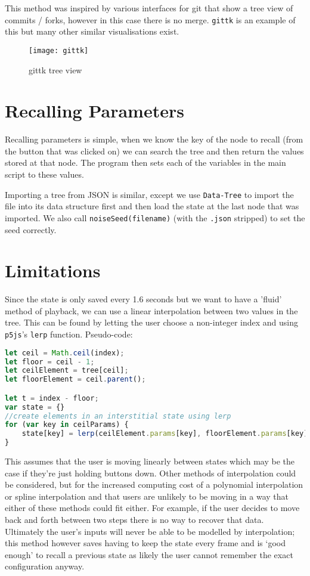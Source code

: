 This method was inspired by various interfaces for git that show a tree view of
commits / forks, however in this case there is no merge. \verb|gittk| is an
example of this but many other similar visualisations exist.

\begin{figure}[H]
    \centering
    \texttt{[image: gittk]}
    \caption{gittk tree view}
\end{figure}

\section{Recalling Parameters}
Recalling parameters is simple, when we know the key of the node to recall (from
the button that was clicked on) we can search the tree and then return the
values stored at that node. The program then sets each of the variables in the
main script to these values.

Importing a tree from JSON is similar, except we use \verb|Data-Tree| to import
the file into its data structure first and then load the state at the last node
that was imported. We also call \verb|noiseSeed(filename)| (with the
\verb|.json| stripped) to set the seed correctly.

\section{Limitations}
Since the state is only saved every 1.6 seconds but we want to have a 'fluid'
method of playback, we can use a linear interpolation between two values in the
tree. This can be found by letting the user choose a non-integer index and using
\verb|p5js|'s \verb|lerp| function. Pseudo-code:

\begin{lstlisting}[language=javascript]
let ceil = Math.ceil(index);
let floor = ceil - 1;
let ceilElement = tree[ceil];
let floorElement = ceil.parent();

let t = index - floor;
var state = {}
//create elements in an interstitial state using lerp
for (var key in ceilParams) {
    state[key] = lerp(ceilElement.params[key], floorElement.params[key], t);
}
\end{lstlisting}

This assumes that the user is moving linearly between states which
may be the case if they're just holding buttons down. Other methods of
interpolation could be considered, but for the increased computing cost of a
polynomial interpolation or spline interpolation and that users are
unlikely to be moving in a way that either of these methods could fit either.
For example, if the user decides to move back and forth between two steps there
is no way to recover that data. Ultimately the user's inputs will never be able
to be modelled by interpolation; this method however saves having to keep the
state every frame and is `good enough' to recall a previous state as likely the
user cannot remember the exact configuration anyway.

